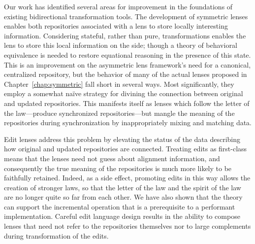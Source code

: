 Our work has identified several areas for improvement in the foundations of
existing bidirectional transformation tools. The development of symmetric
lenses enables both repositories associated with a lens to store locally
interesting information. Considering stateful, rather than pure,
transformations enables the lens to store this local information on the
side; though a theory of behavioral equivalence is needed to restore
equational reasoning in the presence of this state. This is an improvement
on the asymmetric lens framework's need for a canonical, centralized
repository, but the behavior of many of the actual lenses proposed in
Chapter~\ref{chap:symmetric} fall short in several ways. Most
significantly, they employ a somewhat na\"ive strategy for divining the
connection between original and updated repositories. This manifests itself
as lenses which follow the letter of the law---produce synchronized
repositories---but mangle the meaning of the repositories during
synchronization by inappropriately mixing and matching data.

Edit lenses address this problem by elevating the status of the data
describing how original and updated repositories are connected. Treating
edits as first-class means that the lenses need not guess about alignment
information, and consequently the true meaning of the repositories is much
more likely to be faithfully retained. Indeed, as a side effect, promoting
edits in this way allows the creation of stronger laws, so that the letter
of the law and the spirit of the law are no longer quite so far from each
other. We have also shown that the theory can support the incremental
operation that is a prerequisite to a performant implementation. Careful
edit language design results in the ability to compose lenses that need not
refer to the repositories themselves nor to large complements during
transformation of the edits.

